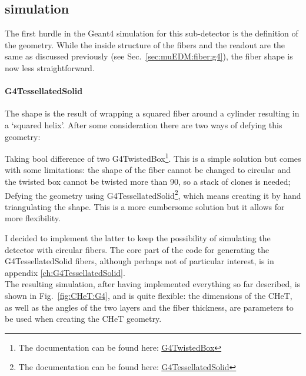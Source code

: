 \begin{refsection}
    \subsection{\gf simulation}
        The first hurdle in the Geant4 simulation for this sub-detector is the definition of the geometry.
        While the inside structure of the fibers and the readout are the same as discussed previously (see Sec.~\ref{sec:muEDM:fiber:g4}), the fiber shape is now less straightforward.
        
        \paragraph{G4TessellatedSolid}
        The shape is the result of wrapping a squared fiber around a cylinder resulting in a `squared helix'.
        After some consideration there are two ways of defying this geometry:
        \begin{outline}
            \1 Taking bool difference of two G4TwistedBox\footnote{The documentation can be found here: \href{https://apc.u-paris.fr/~franco/g4doxy/html/classG4TwistedBox.html}{\underline{G4TwistedBox}}}. 
            This is a simple solution but comes with some limitations: the shape of the fiber cannot be changed to circular and the twisted box cannot be twisted more than \SI{90}{\deg}, so a stack of clones is needed; 
            \1 Defying the geometry using G4TessellatedSolid\footnote{The documentation can be found here: \href{https://apc.u-paris.fr/~franco/g4doxy/html/classG4TessellatedSolid.html}{\underline{G4TessellatedSolid}}}, which means creating it by hand triangulating the shape. This is a more cumbersome solution but it allows for more flexibility.
        \end{outline}
        I decided to implement the latter to keep the possibility of simulating the detector with circular fibers.
        The core part of the code for generating the G4TessellatedSolid fibers, although perhaps not of particular interest, is in appendix \ref{ch:G4TessellatedSolid}.\\

        \noindent
        The resulting simulation, after having implemented everything so far described, is shown in Fig.~\ref{fig:CHeT:G4}, and is quite flexible: the dimensions of the CHeT, as well as the angles of the two layers and the fiber thickness, are parameters to be used when creating the CHeT geometry.


\end{refsection}
